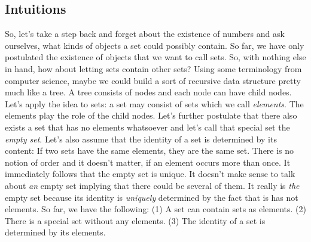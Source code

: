 \subsection{Intuitions}
So, let's take a step back and forget about the existence of numbers and ask ourselves, what kinds of objects a set could possibly contain. So far, we have only postulated the existence of objects that we want to call sets. So, with nothing else in hand, how about letting sets contain other sets? Using some terminology from computer science, maybe we could build a sort of recursive data structure pretty much like a tree. A tree consists of nodes and each node can have child nodes. Let's apply the idea to sets: a set may consist of sets which we call \emph{elements}. The elements play the role of the child nodes. Let's further postulate that there also exists a set that has no elements whatsoever and let's call that special set the \emph{empty set}. Let's also assume that the identity of a set is determined by its content: If two sets have the same elements, they are the same set. There is no notion of order and it doesn't matter, if an element occurs more than once. It immediately follows that the empty set is unique. It doesn't make sense to talk about \emph{an} empty set implying that there could be several of them. It really is \emph{the} empty set because its identity is \emph{uniquely} determined by the fact that is has not elements. So far, we have the following: (1) A set can contain sets as elements. (2) There is a special set without any elements. (3) The identity of a set is determined by its elements.


